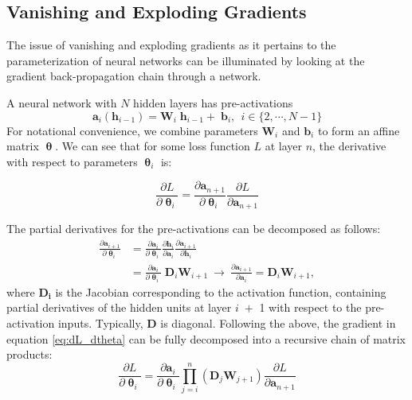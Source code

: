 \documentclass{article} %
\begin{document}
\subsection{Vanishing and Exploding Gradients}

The issue of vanishing and exploding gradients as it pertains to the parameterization of neural networks can be illuminated by looking at the gradient back-propagation chain through a network.

A neural network with ${\mathit{N}}$ hidden layers has pre-activations
\begin{equation}
 \mathbf{a}_i(\mathbf{h}_{i-1}) = \mathbf{W}_i \; \mathbf{h}_{i-1} + \; \mathbf{b}_i, \ \ i \in \{2, \cdots, N-1\}
\end{equation}
For notational convenience, we combine parameters ${\mathbf{W}_i}$ and ${\mathbf{b}_i}$ to form an affine matrix $\boldsymbol{\uptheta}$. We can see that for some loss function ${\mathit{L}}$ at layer ${\mathit{n}}$, the derivative with respect to parameters ${\boldsymbol{\uptheta}_{i}}$ is:

\begin{equation}\label{eq:dL_dtheta}
\frac{\partial L}{\partial \boldsymbol{\uptheta}_{i}} =
\frac{\partial \mathbf{a}_{n+1}}{\partial \boldsymbol{\uptheta} _{i}}
\frac{\partial L}{\partial \mathbf{a}_{n+1}}
\end{equation}

The partial derivatives for the pre-activations can be decomposed as follows:
\begin{equation}\label{eq:chain_rule}
\begin{aligned} 
\frac{\partial \mathbf{a}_{i+1}}{\partial \boldsymbol{\uptheta}_i}
&=
\frac{\partial \mathbf{a}_i}{\partial \boldsymbol{\uptheta}_i}
\frac{\partial \mathbf{h}_i}{\partial \mathbf{a}_i}
\frac{\partial \mathbf{a}_{i+1}}{\partial \mathbf{h}_i}
\\&=
\frac{\partial \mathbf{a}_i}{\partial \boldsymbol{\uptheta}_i} \; \mathbf{D}_i \mathbf{W}_{i+1}
\ \rightarrow \
\frac{\partial \mathbf{a}_{i+1}}{\partial \mathbf{a}_i} = \mathbf{D}_i \mathbf{W}_{i+1},
\end{aligned}
\end{equation}
where ${\mathbf{D_i}}$ is the Jacobian corresponding to the activation function, containing partial derivatives of the hidden units at layer ${\mathit{i \;+}}$ 1 with respect to the pre-activation inputs. Typically, ${\mathbf{D}}$ is diagonal. Following the above, the gradient in equation \ref{eq:dL_dtheta} can be fully decomposed into a recursive chain of matrix products:
\begin{equation}
\frac{\partial L}{\partial \boldsymbol{\uptheta}_{i}} =
\frac{\partial \mathbf{a}_i}{\partial \boldsymbol{\uptheta}_i}
\prod_{j=i}^{n} (\mathbf{D}_j \mathbf{W}_{j+1})
\frac{\partial L}{\partial \mathbf{a}_{n+1}}
\end{equation}
\end{document}
